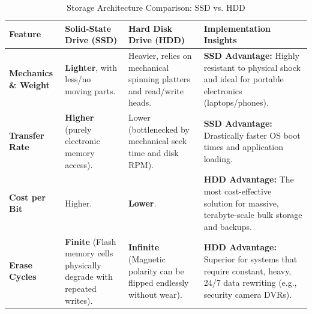 \documentclass[10pt]{article}
\begin{document}
\begin{table}[H]
    \centering
    \footnotesize 
    \renewcommand{\arraystretch}{1.2} 
    \begin{tabular}{@{} l p{3.5cm} p{3.5cm} p{4.5cm} @{}}
        \toprule
        \textbf{Feature} & \textbf{Solid-State Drive (SSD)} & \textbf{Hard Disk Drive (HDD)} & \textbf{Implementation Insights} \\
        \midrule
        \textbf{Mechanics \& Weight} & 
        \textbf{Lighter}, with less/no moving parts. & 
        Heavier, relies on mechanical spinning platters and read/write heads. & 
        \textbf{SSD Advantage:} Highly resistant to physical shock and ideal for portable electronics (laptops/phones). \\
        
        \textbf{Transfer Rate} & 
        \textbf{Higher} (purely electronic memory access). & 
        Lower (bottlenecked by mechanical seek time and disk RPM). & 
        \textbf{SSD Advantage:} Drastically faster OS boot times and application loading. \\
        
        \textbf{Cost per Bit} & 
        Higher. & 
        \textbf{Lower}. & 
        \textbf{HDD Advantage:} The most cost-effective solution for massive, terabyte-scale bulk storage and backups. \\
        
        \textbf{Erase Cycles} & 
        \textbf{Finite} (Flash memory cells physically degrade with repeated writes). & 
        \textbf{Infinite} (Magnetic polarity can be flipped endlessly without wear). & 
        \textbf{HDD Advantage:} Superior for systems that require constant, heavy, 24/7 data rewriting (e.g., security camera DVRs). \\
        \bottomrule
    \end{tabular}
    \caption{Storage Architecture Comparison: SSD vs. HDD}
\end{table}

\newpage
\end{document}
